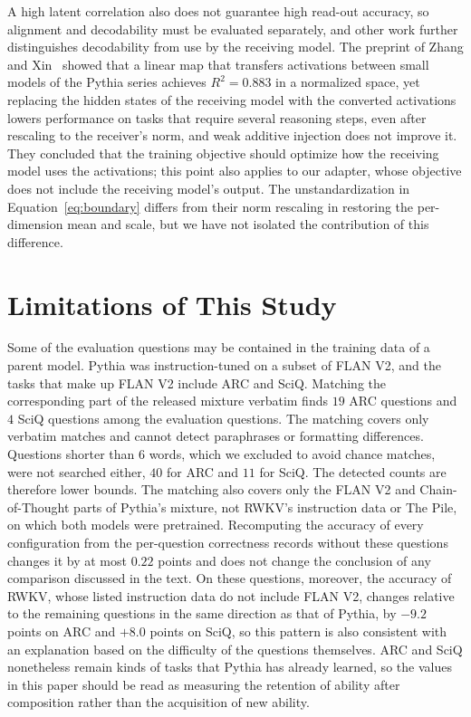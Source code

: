 \documentclass[conference]{IEEEtran}
\begin{document}
A high latent correlation also does not guarantee high read-out accuracy, so alignment and decodability must be evaluated separately,
and other work further distinguishes decodability from use by the receiving model. The preprint of Zhang and Xin~\cite{zhang2026negativeresultcrossmodelactivation}
showed that a linear map that transfers activations between small models of the Pythia series achieves $R^2=0.883$ in a normalized space, yet replacing the
hidden states of the receiving model with the converted activations lowers performance on tasks that require several reasoning steps,
even after rescaling to the receiver's norm, and weak additive injection does not improve it. They concluded that the training objective should optimize how the receiving
model uses the activations; this point also applies to our adapter, whose objective does not include the receiving model's output.
The unstandardization in Equation~\eqref{eq:boundary} differs from their norm rescaling in restoring the per-dimension mean and scale,
but we have not isolated the contribution of this difference.

\section{Limitations of This Study}\label{sec:limitations}
Some of the evaluation questions may be contained in the training data of a parent model. Pythia was instruction-tuned on a subset of
FLAN V2, and the tasks that make up FLAN V2 include ARC and SciQ. Matching the corresponding part of the released mixture verbatim finds
$19$ ARC questions and $4$ SciQ questions among the evaluation questions. The matching covers only verbatim matches and cannot detect
paraphrases or formatting differences. Questions shorter than $6$ words, which we excluded to avoid chance matches, were not searched
either, $40$ for ARC and $11$ for SciQ. The detected counts are therefore lower bounds. The matching also covers only the FLAN V2 and Chain-of-Thought parts of Pythia's mixture,
not RWKV's instruction data or The Pile, on which both models were pretrained. Recomputing the accuracy of every configuration
from the per-question correctness records without these questions changes it by at most $0.22$ points and does not change the
conclusion of any comparison discussed in the text. On these questions, moreover, the accuracy of RWKV, whose listed instruction data do not include FLAN V2,
changes relative to the remaining questions in the same direction as that of Pythia, by $-9.2$ points on ARC and $+8.0$ points on SciQ, so this pattern is also consistent with an explanation based on the difficulty of the
questions themselves. ARC and SciQ nonetheless remain kinds of tasks that Pythia has
already learned, so the values in this paper should be read as measuring the retention of ability after composition rather than the
acquisition of new ability.
\end{document}
